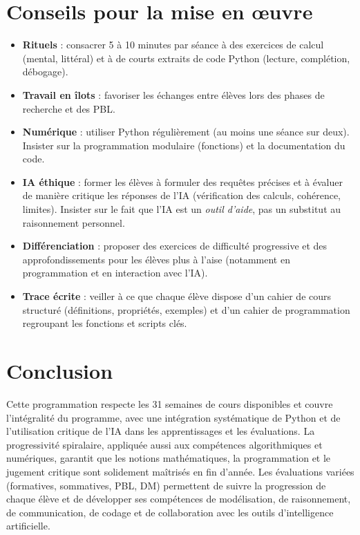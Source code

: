 \documentclass[a4paper,12pt]{article}
\begin{document}
	\section{Conseils pour la mise en œuvre}
	\begin{itemize}
		\item \textbf{Rituels} : consacrer 5 à 10 minutes par séance à des exercices de calcul (mental, littéral) et à de courts extraits de code Python (lecture, complétion, débogage).
		\item \textbf{Travail en îlots} : favoriser les échanges entre élèves lors des phases de recherche et des PBL.
		\item \textbf{Numérique} : utiliser Python régulièrement (au moins une séance sur deux). Insister sur la programmation modulaire (fonctions) et la documentation du code.
		\item \textbf{IA éthique} : former les élèves à formuler des requêtes précises et à évaluer de manière critique les réponses de l’IA (vérification des calculs, cohérence, limites). Insister sur le fait que l’IA est un \emph{outil d’aide}, pas un substitut au raisonnement personnel.
		\item \textbf{Différenciation} : proposer des exercices de difficulté progressive et des approfondissements pour les élèves plus à l’aise (notamment en programmation et en interaction avec l’IA).
		\item \textbf{Trace écrite} : veiller à ce que chaque élève dispose d’un cahier de cours structuré (définitions, propriétés, exemples) et d’un cahier de programmation regroupant les fonctions et scripts clés.
	\end{itemize}
	
	\section*{Conclusion}
	Cette programmation respecte les 31 semaines de cours disponibles et couvre l’intégralité du programme, avec une intégration systématique de Python et de l’utilisation critique de l’IA dans les apprentissages et les évaluations. La progressivité spiralaire, appliquée aussi aux compétences algorithmiques et numériques, garantit que les notions mathématiques, la programmation et le jugement critique sont solidement maîtrisés en fin d’année. Les évaluations variées (formatives, sommatives, PBL, DM) permettent de suivre la progression de chaque élève et de développer ses compétences de modélisation, de raisonnement, de communication, de codage et de collaboration avec les outils d’intelligence artificielle.
	
\end{document}
